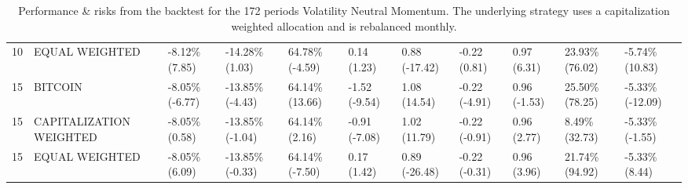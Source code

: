 \documentclass{article}
\begin{document}
\begin{landscape}
\begin{table}[H]
\begin{tabular}{p{0.4cm}|p{3cm}|p{1.65cm}|p{1.65cm}|p{1.65cm}|p{1.65cm}|p{1.65cm}|p{1.65cm}|p{1.65cm}|p{1.65cm}|p{1.65cm}}
\\ 
10&EQUAL WEIGHTED&-8.12\% (7.85)&-14.28\% (1.03)&64.78\% (-4.59)&0.14 (1.23)&0.88 (-17.42)&-0.22 (0.81)&0.97 (6.31)&23.93\% (76.02)&-5.74\% (10.83)
\\ 
15&BITCOIN&-8.05\% (-6.77)&-13.85\% (-4.43)&64.14\% (13.66)&-1.52 (-9.54)&1.08 (14.54)&-0.22 (-4.91)&0.96 (-1.53)&25.50\% (78.25)&-5.33\% (-12.09)
\\ 
15&CAPITALIZATION WEIGHTED&-8.05\% (0.58)&-13.85\% (-1.04)&64.14\% (2.16)&-0.91 (-7.08)&1.02 (11.79)&-0.22 (-0.91)&0.96 (2.77)&8.49\% (32.73)&-5.33\% (-1.55)
\\ 
15&EQUAL WEIGHTED&-8.05\% (6.09)&-13.85\% (-0.33)&64.14\% (-7.50)&0.17 (1.42)&0.89 (-26.48)&-0.22 (-0.31)&0.96 (3.96)&21.74\% (94.92)&-5.33\% (8.44)
\\ 
    \bottomrule
  \end{tabular}
  \label{tab:volneutmom172capiweight}
   \caption{Performance \& risks from the backtest for the 172 periods Volatility Neutral Momentum. The underlying strategy uses a capitalization weighted allocation and is rebalanced monthly.}
\end{table}
\end{landscape}
\end{document}
